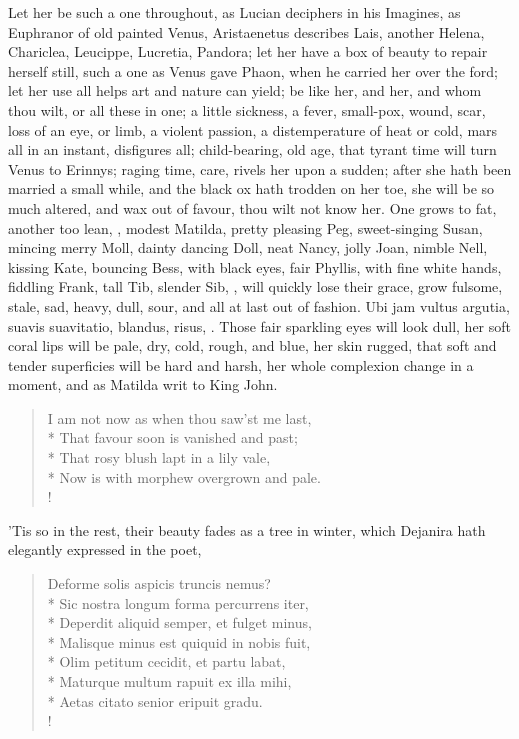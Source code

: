 Let her be such a one throughout, as Lucian deciphers in his Imagines,
as Euphranor of old painted Venus, Aristaenetus describes Lais, another
Helena, Chariclea, Leucippe, Lucretia, Pandora; let her have a box of
beauty to repair herself still, such a one as Venus gave Phaon, when he
carried her over the ford; let her use all helps art and nature can
yield; be like her, and her, and whom thou wilt, or all these in one; a
little sickness, a fever, small-pox, wound, scar, loss of an eye, or
limb, a violent passion, a distemperature of heat or cold, mars all in
an instant, disfigures all; child-bearing, old age, that tyrant time
will turn Venus to Erinnys; raging time, care, rivels her upon a
sudden; after she hath been married a small while, and the black ox
hath trodden on her toe, she will be so much altered, and wax out of
favour, thou wilt not know her. One grows to fat, another too lean,
\etc{}, modest Matilda, pretty pleasing Peg, sweet-singing Susan, mincing
merry Moll, dainty dancing Doll, neat Nancy, jolly Joan, nimble Nell,
kissing Kate, bouncing Bess, with black eyes, fair Phyllis, with fine
white hands, fiddling Frank, tall Tib, slender Sib, \etc{}, will quickly
lose their grace, grow fulsome, stale, sad, heavy, dull, sour, and all
at last out of fashion. Ubi jam vultus argutia, suavis suavitatio,
blandus, risus, \etc{}. Those fair sparkling eyes will look dull, her soft
coral lips will be pale, dry, cold, rough, and blue, her skin rugged,
that soft and tender superficies will be hard and harsh, her whole
complexion change in a moment, and as Matilda writ to King John.
%
\begin{verse}%
I am not now as when thou saw'st me last,\\*
That favour soon is vanished and past;\\*
That rosy blush lapt in a lily vale,\\*
Now is with morphew overgrown and pale.\\!
\end{verse}%
%
'Tis so in the rest, their beauty fades as a tree in winter, which Dejanira
hath elegantly expressed in the poet,
%
\begin{latin}%
\begin{verse}%
Deforme solis aspicis truncis nemus?\\*
Sic nostra longum forma percurrens iter,\\*
Deperdit aliquid semper, et fulget minus,\\*
Malisque minus est quiquid in nobis fuit,\\*
Olim petitum cecidit, et partu labat,\\*
Maturque multum rapuit ex illa mihi,\\*
Aetas citato senior eripuit gradu.\\!
\end{verse}%
\end{latin}%
